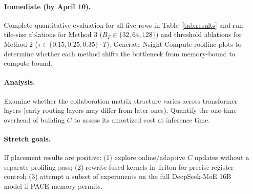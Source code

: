 \documentclass{article}
\begin{document}
\paragraph{Immediate (by April 10).}
Complete quantitative evaluation for all five rows in Table~\ref{tab:results} and
run tile-size ablations for Method 3 ($B_T \in \{32, 64, 128\}$) and threshold
ablations for Method 2 ($\tau \in \{0.15, 0.25, 0.35\} \cdot T$).
Generate Nsight Compute roofline plots to determine whether each method shifts the
bottleneck from memory-bound to compute-bound.
 
\paragraph{Analysis.}
Examine whether the collaboration matrix structure varies across transformer layers
(early routing layers may differ from later ones).
Quantify the one-time overhead of building $C$ to assess its amortized cost at
inference time.
 
\paragraph{Stretch goals.}
If placement results are positive: (1) explore online/adaptive $C$ updates without
a separate profiling pass; (2) rewrite fused kernels in Triton for precise register
control; (3) attempt a subset of experiments on the full DeepSeek-MoE 16B model if
PACE memory permits.
 


 
\end{document}
